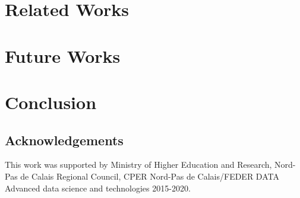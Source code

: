 \documentclass[conference]{IEEEtran}
\begin{document}
\section{Related Works}
\label{sec:related}



\section{Future Works}
\label{sec:future}


\section{Conclusion}
\label{sec:conclusion}


\subsection*{Acknowledgements} 
This work was supported by Ministry of Higher Education and Research, Nord-Pas de Calais Regional Council, CPER Nord-Pas de Calais/FEDER DATA Advanced data science and technologies 2015-2020.



\end{document}
